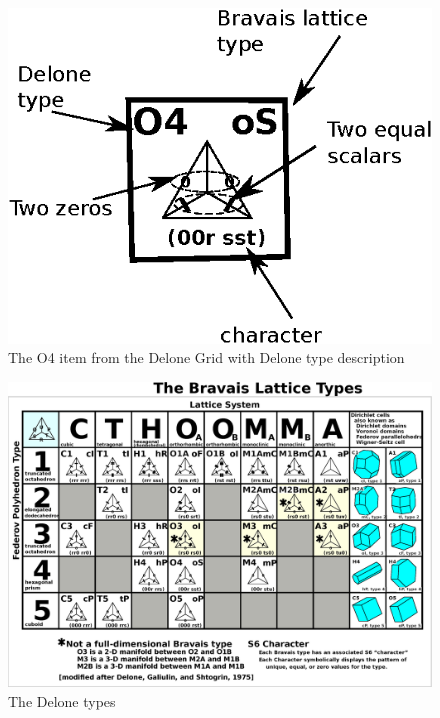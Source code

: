 \documentclass[preprint]{iucr}              %
\begin{document}
	
	\begin{figure}
		\caption{The O4 item from the Delone Grid with Delone type description}
		\label{fig:O4_terminology}
		\includegraphics[width=12cm]{O4_terminology}
	\end{figure}
	
	\begin{figure}
		\centering
		\includegraphics[angle=90, width=0.7\textheight]{DeloneGridClaude_2-3}
		\caption{The Delone types}
		\label{fig:rotatedDeloneTypes}
	\end{figure}
	
\end{document}
